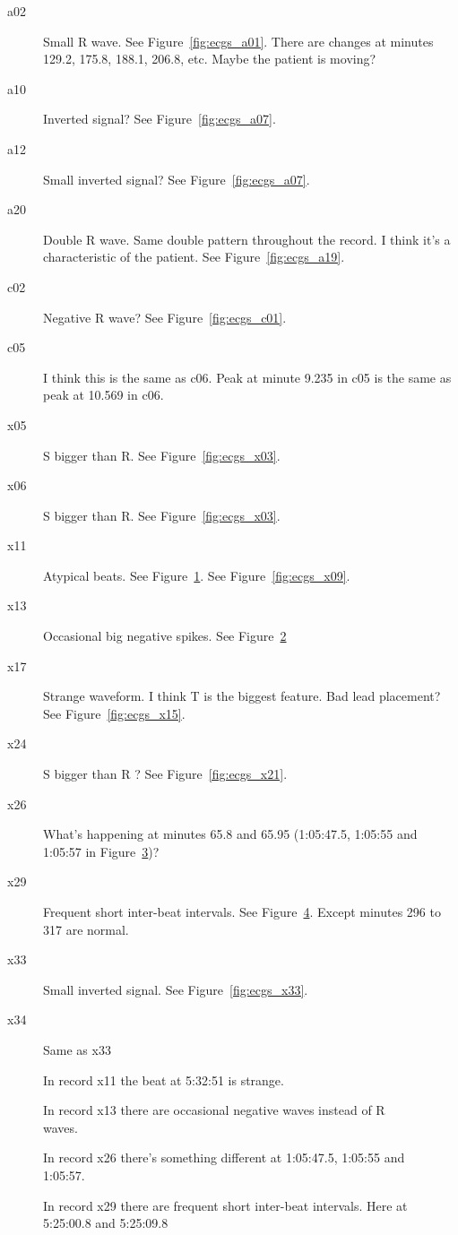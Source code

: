 \documentclass[12pt]{article}
\begin{document}
\begin{description}
\item[a02] Small R wave.  See Figure~\ref{fig:ecgs_a01}.  There are
  changes at minutes 129.2, 175.8, 188.1, 206.8, etc.  Maybe the
  patient is moving?
\item[a10] Inverted signal?  See Figure~\ref{fig:ecgs_a07}.
\item[a12] Small inverted signal?  See Figure~\ref{fig:ecgs_a07}.
\item[a20] Double R wave.  Same double pattern throughout the record.
  I think it's a characteristic of the patient.  See
  Figure~\ref{fig:ecgs_a19}.
\item[c02] Negative R wave?  See Figure~\ref{fig:ecgs_c01}.
\item[c05] I think this is the same as c06.  Peak at minute 9.235 in
  c05 is the same as peak at 10.569 in c06.
\item[x05] S bigger than R.  See Figure~\ref{fig:ecgs_x03}.
\item[x06] S bigger than R.  See Figure~\ref{fig:ecgs_x03}.
\item[x11] Atypical beats.  See Figure~\ref{fig:x11_332.83}.  See
  Figure~\ref{fig:ecgs_x09}.
\item[x13] Occasional big negative spikes.  See Figure~\ref{fig:x13_165.5}
\item[x17] Strange waveform.  I think T is the biggest feature.  Bad
  lead placement?  See Figure~\ref{fig:ecgs_x15}.
\item[x24] S bigger than R ?  See Figure~\ref{fig:ecgs_x21}.
\item[x26] What's happening at minutes 65.8 and 65.95 (1:05:47.5,
  1:05:55 and 1:05:57 in Figure~\ref{fig:x26_65.78})?
\item[x29] Frequent short inter-beat intervals.  See
  Figure~\ref{fig:x29_328.95}.  Except minutes 296 to 317 are normal.
\item[x33] Small inverted signal.  See Figure~\ref{fig:ecgs_x33}.
\item[x34] Same as x33
\end{description}

\newcommand{\StrangePlot}[2]{
  \begin{figure}
    \centering
    \caption{#2}
    \label{fig:#1}
  \end{figure}
}

\StrangePlot{x11_332.83}{In record x11 the beat at 5:32:51 is strange.}
\StrangePlot{x13_165.5}{In record x13 there are occasional negative
  waves instead of R waves.}
\StrangePlot{x26_65.78}{In record x26 there's something
  different at 1:05:47.5, 1:05:55 and 1:05:57.}
\StrangePlot{x29_328.95}{In record x29 there are frequent short
  inter-beat intervals.  Here at 5:25:00.8 and 5:25:09.8}
\end{document}
